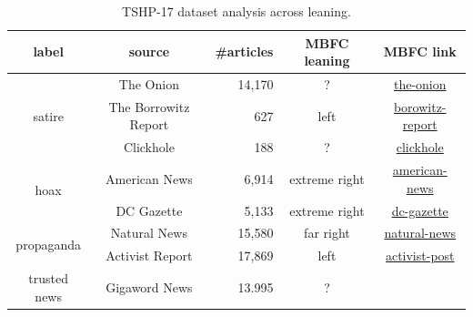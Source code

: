 \begin{table}[!htbp]
    \centering
    \begin{tabular}{c|c|r|c|c}
        label                       & source               & \#articles & MBFC leaning  & MBFC link                                                                        \\
        \hline
        \multirow{3}{*}{satire}     & The Onion            & 14,170     & ?             & \href{https://mediabiasfactcheck.com/the-onion/}{the-onion}                      \\
                                    & The Borrowitz Report & 627        & left          & \href{https://mediabiasfactcheck.com/borowitz-report/}{borowitz-report}          \\
                                    & Clickhole            & 188        & ?             & \href{https://mediabiasfactcheck.com/clickhole/}{clickhole}                      \\
        \hline
        \multirow{2}{*}{hoax}       & American News        & 6,914      & extreme right & \href{https://mediabiasfactcheck.com/anews-24-com-american-news/}{american-news} \\
                                    & DC Gazette           & 5,133      & extreme right & \href{https://mediabiasfactcheck.com/dc-gazette/}{dc-gazette}                    \\
        \hline
        \multirow{2}{*}{propaganda} & Natural News         & 15,580     & far right     & \href{https://mediabiasfactcheck.com/natural-news/}{natural-news}                \\
                                    & Activist Report      & 17,869     & left          & \href{https://mediabiasfactcheck.com/activist-post/}{activist-post}              \\
        \hline
        trusted news                & Gigaword News        & 13.995     & ?             &
    \end{tabular}
    \caption{TSHP-17 dataset analysis across leaning.}
    \label{tab:tshp17_across_leaning}
\end{table}


